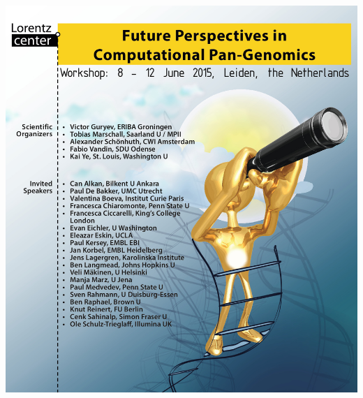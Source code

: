\documentclass[notes=hide]{beamer}
\newcommand{\0}{\ensuremath{\mathtt{0}}}
\newcommand{\1}{\ensuremath{\mathtt{1}}}
\begin{document}
{ 
\begin{frame}
\includegraphics[width=.95\textwidth]{figs/lorentzposter}
\end{frame}
}
\end{document}
